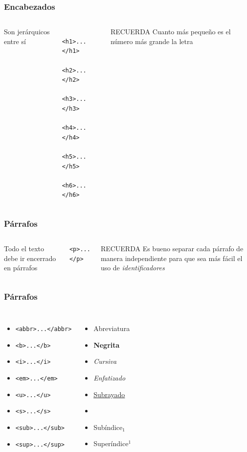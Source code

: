 \documentclass{beamer}
\begin{document}
\begin{frame}[fragile]
\frametitle{Encabezados}
	\begin{columns}[c]
	Son jerárquicos entre sí
	\begin{verbatim}
	<h1>...</h1>
	<h2>...</h2>
	<h3>...</h3>
	<h4>...</h4>
	<h5>...</h5>
	<h6>...</h6>
	\end{verbatim}
	\pause
	\begin{exampleblock}{RECUERDA}
	Cuanto más pequeño es el número más grande la letra
	\end{exampleblock}
	\end{columns}
\end{frame}

\begin{frame}[fragile]
\frametitle{Párrafos}
	\begin{columns}[c]
	Todo el texto debe ir encerrado en párrafos
	\newline
	
	\verb|<p>...</p>|
	\pause
	\begin{exampleblock}{RECUERDA}
	Es bueno separar cada párrafo de manera independiente para que sea más fácil el uso de \textit{identificadores}
	\end{exampleblock}
	\end{columns}
\end{frame}

\begin{frame}[fragile]
\frametitle{Párrafos}
	\begin{columns}[c]
	\begin{itemize}
	\item \verb|<abbr>...</abbr>|
	\item \verb|<b>...</b>|
	\item \verb|<i>...</i>|
	\item \verb|<em>...</em>|
	\item \verb|<u>...</u>|
	\item \verb|<s>...</s>|
	\item \verb|<sub>...</sub>|
	\item \verb|<sup>...</sup>|
	\end{itemize}
	\pause
	\begin{itemize}[<+->]
	\item Abreviatura
	\item \textbf{Negrita}
	\item \textit{Cursiva}
	\item \emph{Enfatizado}
	\item \underline{Subrayado}
	\item {}
	\item Subíndice$_1$
	\item Superíndice$^1$
	\end{itemize}
	\end{columns}
\end{frame}
\end{document}
